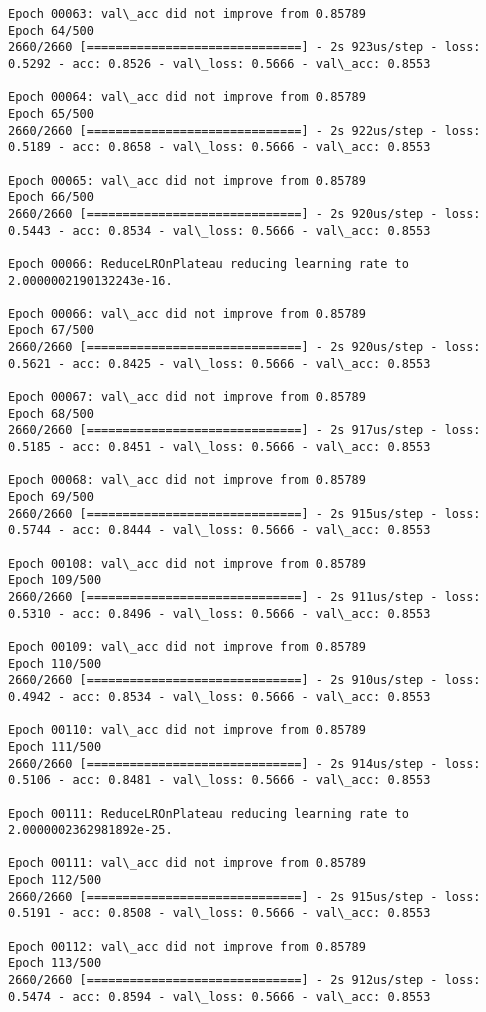 \documentclass[11pt]{article}
\begin{document}
\begin{Verbatim}[commandchars=\\\{\}]
Epoch 00063: val\_acc did not improve from 0.85789
Epoch 64/500
2660/2660 [==============================] - 2s 923us/step - loss: 0.5292 - acc: 0.8526 - val\_loss: 0.5666 - val\_acc: 0.8553

Epoch 00064: val\_acc did not improve from 0.85789
Epoch 65/500
2660/2660 [==============================] - 2s 922us/step - loss: 0.5189 - acc: 0.8658 - val\_loss: 0.5666 - val\_acc: 0.8553

Epoch 00065: val\_acc did not improve from 0.85789
Epoch 66/500
2660/2660 [==============================] - 2s 920us/step - loss: 0.5443 - acc: 0.8534 - val\_loss: 0.5666 - val\_acc: 0.8553

Epoch 00066: ReduceLROnPlateau reducing learning rate to 2.0000002190132243e-16.

Epoch 00066: val\_acc did not improve from 0.85789
Epoch 67/500
2660/2660 [==============================] - 2s 920us/step - loss: 0.5621 - acc: 0.8425 - val\_loss: 0.5666 - val\_acc: 0.8553

Epoch 00067: val\_acc did not improve from 0.85789
Epoch 68/500
2660/2660 [==============================] - 2s 917us/step - loss: 0.5185 - acc: 0.8451 - val\_loss: 0.5666 - val\_acc: 0.8553

Epoch 00068: val\_acc did not improve from 0.85789
Epoch 69/500
2660/2660 [==============================] - 2s 915us/step - loss: 0.5744 - acc: 0.8444 - val\_loss: 0.5666 - val\_acc: 0.8553

Epoch 00108: val\_acc did not improve from 0.85789
Epoch 109/500
2660/2660 [==============================] - 2s 911us/step - loss: 0.5310 - acc: 0.8496 - val\_loss: 0.5666 - val\_acc: 0.8553

Epoch 00109: val\_acc did not improve from 0.85789
Epoch 110/500
2660/2660 [==============================] - 2s 910us/step - loss: 0.4942 - acc: 0.8534 - val\_loss: 0.5666 - val\_acc: 0.8553

Epoch 00110: val\_acc did not improve from 0.85789
Epoch 111/500
2660/2660 [==============================] - 2s 914us/step - loss: 0.5106 - acc: 0.8481 - val\_loss: 0.5666 - val\_acc: 0.8553

Epoch 00111: ReduceLROnPlateau reducing learning rate to 2.0000002362981892e-25.

Epoch 00111: val\_acc did not improve from 0.85789
Epoch 112/500
2660/2660 [==============================] - 2s 915us/step - loss: 0.5191 - acc: 0.8508 - val\_loss: 0.5666 - val\_acc: 0.8553

Epoch 00112: val\_acc did not improve from 0.85789
Epoch 113/500
2660/2660 [==============================] - 2s 912us/step - loss: 0.5474 - acc: 0.8594 - val\_loss: 0.5666 - val\_acc: 0.8553


\end{Verbatim}
\end{document}
